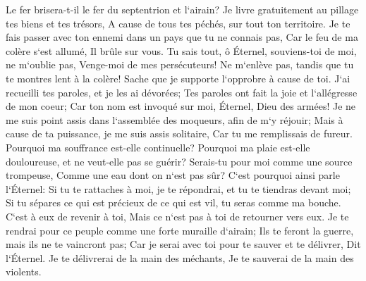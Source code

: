 \verse Le fer brisera-t-il le fer du septentrion et l`airain? 
\verse Je livre gratuitement au pillage tes biens et tes trésors, A cause de tous tes péchés, sur tout ton territoire. 
\verse Je te fais passer avec ton ennemi dans un pays que tu ne connais pas, Car le feu de ma colère s`est allumé, Il brûle sur vous. 
\verse Tu sais tout, ô Éternel, souviens-toi de moi, ne m`oublie pas, Venge-moi de mes persécuteurs! Ne m`enlève pas, tandis que tu te montres lent à la colère! Sache que je supporte l`opprobre à cause de toi. 
\verse J`ai recueilli tes paroles, et je les ai dévorées; Tes paroles ont fait la joie et l`allégresse de mon coeur; Car ton nom est invoqué sur moi, Éternel, Dieu des armées! 
\verse Je ne me suis point assis dans l`assemblée des moqueurs, afin de m`y réjouir; Mais à cause de ta puissance, je me suis assis solitaire, Car tu me remplissais de fureur. 
\verse Pourquoi ma souffrance est-elle continuelle? Pourquoi ma plaie est-elle douloureuse, et ne veut-elle pas se guérir? Serais-tu pour moi comme une source trompeuse, Comme une eau dont on n`est pas sûr? 
\verse C`est pourquoi ainsi parle l`Éternel: Si tu te rattaches à moi, je te répondrai, et tu te tiendras devant moi; Si tu sépares ce qui est précieux de ce qui est vil, tu seras comme ma bouche. C`est à eux de revenir à toi, Mais ce n`est pas à toi de retourner vers eux. 
\verse Je te rendrai pour ce peuple comme une forte muraille d`airain; Ils te feront la guerre, mais ils ne te vaincront pas; Car je serai avec toi pour te sauver et te délivrer, Dit l`Éternel. 
\verse Je te délivrerai de la main des méchants, Je te sauverai de la main des violents. 

